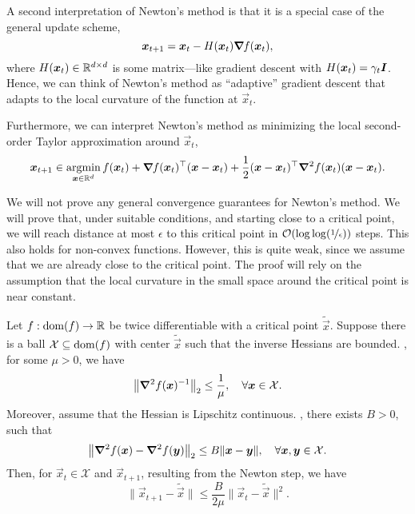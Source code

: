 A second interpretation of Newton's method is that it is a special case of the general update
scheme, \[
    \bm{x}_{t+1} = \bm{x}_t - H(\bm{x}_t) \bm{\nabla}_{\! } f(\bm{x}_t),
\]
where $H(\bm{x}_t) \in \mathbb{R}^{d \times d}$ is some matrix---like gradient descent with $H(\bm{x}_t)
    = \gamma_t \bm{I}$. Hence, we can think of Newton's method as ``adaptive'' gradient descent that
adapts to the local curvature of the function at $\vec{x}_t$.

Furthermore, we can interpret Newton's method as minimizing the local second-order Taylor
approximation around $\vec{x}_t$, \[
    \bm{x}_{t+1} \in \operatorname*{argmin}_{\bm{x} \in \mathbb{R}^d} f(\bm{x}_t) + \bm{\nabla}_{\! } f(\bm{x}_t)^\top(\bm{x} - \bm{x}_t) + \frac{1}{2} (\bm{x} - \bm{x}_t)^\top \bm{\nabla}^2_{\! } f(\bm{x}_t)(\bm{x} - \bm{x}_t).
\]

We will not prove any general convergence guarantees for Newton's method. We will prove that, under
suitable conditions, and starting close to a critical point, we will reach distance at most
$\epsilon$ to this critical point in $\bigo{\log \log(\nicefrac{1}{\epsilon})}$ steps. This also
holds for non-convex functions. However, this is quite weak, since we assume that we are already
close to the critical point. The proof will rely on the assumption that the local curvature in the
small space around the critical point is near constant.

\begin{theorem} \label{thm:newton}
    Let $f: \mathrm{dom}(f) \to \mathbb{R}$ be twice differentiable with a critical point $\tilde{\vec{x}}$. Suppose
    there is a ball $\mathcal{X} \subseteq \mathrm{dom}(f)$ with center $\tilde{\vec{x}}$ such that the inverse
    Hessians are bounded. \Ie, for some $\mu > 0$, we have \[
        \lft\| \inv{\hess{f(\vec{x})}{}} \rgt\|_2 \leq \frac{1}{\mu}, \quad \forall \vec{x} \in \mathcal{X}.
    \]
    Moreover, assume that the Hessian is Lipschitz continuous. \Ie, there exists $B > 0$, such that \[
        \lft\| \hess{f(\vec{x})}{} - \hess{f(\vec{y})}{} \rgt\|_2 \leq B \| \vec{x} - \vec{y} \|, \quad \forall \vec{x},\vec{y}\in \mathcal{X}.
    \]
    Then, for $\vec{x}_t \in \mathcal{X}$ and $\vec{x}_{t+1}$, resulting from the Newton step, we have \[
        \| \vec{x}_{t+1} - \tilde{\vec{x}} \| \leq \frac{B}{2 \mu} \| \vec{x}_t - \tilde{\vec{x}} \|^2.
    \]
\end{theorem}

